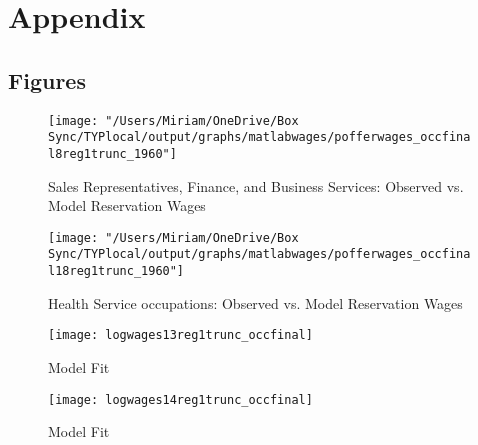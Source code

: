 \documentclass[12pt]{article}
\begin{document}
\newpage

\clearpage

\section{Appendix}


\subsection{Figures}



\begin{figure}[H]
\centering
\caption{Sales Representatives, Finance, and Business Services: Observed vs. Model Reservation Wages}
\label{sales}
\texttt{[image: "/Users/Miriam/OneDrive/Box Sync/TYPlocal/output/graphs/matlabwages/pofferwages\_occfinal8reg1trunc\_1960"]}
\end{figure}

\begin{figure}[H]
\centering
\caption{Health Service occupations: Observed vs. Model Reservation Wages}
\label{health}
\texttt{[image: "/Users/Miriam/OneDrive/Box Sync/TYPlocal/output/graphs/matlabwages/pofferwages\_occfinal18reg1trunc\_1960"]}
\end{figure}

\begin{figure}[H]
\centering
\caption{Model Fit}
\label{fig:modelwages1}
\texttt{[image: logwages13reg1trunc\_occfinal]}
\end{figure}

\begin{figure}[H]
\centering
\caption{Model Fit}
\label{fig:modelwages2}
\texttt{[image: logwages14reg1trunc\_occfinal]}
\end{figure}
\end{document}
